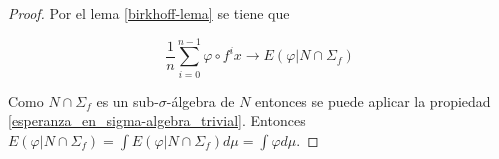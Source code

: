 \begin{proof}
	Por el lema \ref{birkhoff-lema} se tiene que
	
	\begin{equation}
		\frac{1}{n} \sum_{i=0}^{n-1} \varphi \circ f^i x \rightarrow E(\varphi|N \cap \Sigma_f)
	\end{equation}
	
	Como $N \cap \Sigma_f$ es un sub-$\sigma$-álgebra de $N$ entonces se puede aplicar la propiedad \ref{esperanza_en_sigma-algebra_trivial}. Entonces $E(\varphi|N \cap \Sigma_f) = \int E(\varphi|N \cap \Sigma_f) d\mu = \int \varphi d\mu$. 
\end{proof}